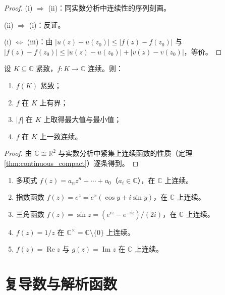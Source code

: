 \begin{proof}
(i) $\Rightarrow$ (ii)：同实数分析中连续性的序列刻画。

(ii) $\Rightarrow$ (i)：反证。

(i) $\Leftrightarrow$ (iii)：由 $|u(z) - u(z_0)| \le |f(z) - f(z_0)|$ 与 $|f(z) - f(z_0)| \le |u(z) - u(z_0)| + |v(z) - v(z_0)|$，等价。
\end{proof}

\begin{theorem}[紧集上连续函数的性质]\label{thm:ca_continuous_compact}
设 $K \subseteq \mathbb{C}$ 紧致，$f: K \to \mathbb{C}$ 连续。则：
\begin{enumerate}[label=(\roman*)]
    \item $f(K)$ 紧致；
    \item $f$ 在 $K$ 上有界；
    \item $|f|$ 在 $K$ 上取得最大值与最小值；
    \item $f$ 在 $K$ 上一致连续。
\end{enumerate}
\end{theorem}

\begin{proof}
由 $\mathbb{C} \cong \mathbb{R}^2$ 与实数分析中紧集上连续函数的性质（定理 \ref{thm:continuous_compact}）逐条得到。
\end{proof}

\begin{example}[复变函数的实例]\label{ex:ca_function_examples}
\begin{enumerate}[label=(\roman*)]
    \item 多项式 $f(z) = a_n z^n + \cdots + a_0$（$a_i \in \mathbb{C}$），在 $\mathbb{C}$ 上连续。
    \item 指数函数 $f(z) = e^z = e^x (\cos y + i \sin y)$，在 $\mathbb{C}$ 上连续。
    \item 三角函数 $f(z) = \sin z = (e^{iz} - e^{-iz})/(2i)$，在 $\mathbb{C}$ 上连续。
    \item $f(z) = 1/z$ 在 $\mathbb{C}^\times = \mathbb{C} \setminus \{0\}$ 上连续。
    \item $f(z) = \operatorname{Re} z$ 与 $g(z) = \operatorname{Im} z$ 在 $\mathbb{C}$ 上连续。
\end{enumerate}
\end{example}

\section{复导数与解析函数}

